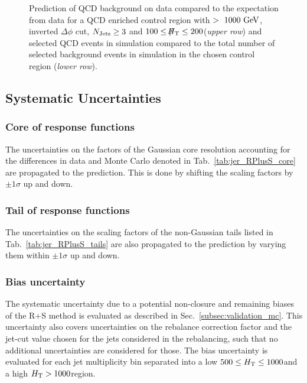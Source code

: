 \begin{figure}[!t]
\begin{tabular}{cc}
  \end{tabular}
  \caption{Prediction of QCD background on data compared to the expectation from data for a QCD enriched control region with \HT$>~1000~\rm{GeV}$, inverted $\Delta \phi$ cut, $N_{\text{Jets}} \geq 3$ and $100 \leq \slash\mkern-12mu{H}_{\text{T}} \leq 200$\gev (\textit{upper row}) and selected QCD events in simulation compared to the total number of selected background events in simulation in the chosen control region (\textit{lower row}).}
  \label{fig:qcd_rs_dataclosure}
\end{figure}

\subsection{Systematic Uncertainties}
\label{subsec:RA2_syst_unc}
\subsubsection*{Core of response functions} The uncertainties on the factors of the Gaussian core resolution accounting for the differences in data and Monte Carlo denoted in Tab.~\ref{tab:jer_RPlusS_core} are propagated to the prediction. This is done by shifting the scaling factors by $\pm 1\sigma$ up and down. 
\subsubsection*{Tail of response functions} The uncertainties on the scaling factors of the non-Gaussian tails listed in Tab.~\ref{tab:jer_RPlusS_tails} are also propagated to the prediction by varying them within $\pm 1\sigma$ up and down. 
\subsubsection*{Bias uncertainty} The systematic uncertainty due to a potential non-closure and remaining biases of the R+S method is evaluated as described in Sec.~\ref{subsec:validation_mc}. This uncertainty also covers uncertainties on the rebalance correction factor and the jet-\pt cut value chosen for the jets considered in the rebalancing, such that no additional uncertainties are considered for those. The bias uncertainty is evaluated for each jet multiplicity bin separated into a low $ 500 \leq H_{\text{T}} \leq 1000$\gev and a high $H_{\text{T}} > 1000$\gev region.

